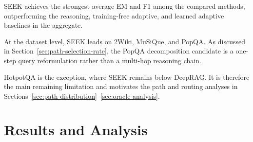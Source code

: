 \documentclass{nthu_thesis}
\begin{document}
\begin{thesiscjk}
\begin{table}[h]
    \centering
    \caption[Main Results]{Main EM/F1 results on the first 1{,}000 development examples from each dataset.}
    \label{tab:main-results}
    \setlength{\tabcolsep}{4pt}
    \scriptsize
\end{table}

SEEK achieves the strongest average EM and F1 among the compared methods, outperforming the reasoning, training-free adaptive, and learned adaptive baselines in the aggregate.

At the dataset level, SEEK leads on 2Wiki, MuSiQue, and PopQA. As discussed in Section~\ref{sec:path-selection-rate}, the PopQA decomposition candidate is a one-step query reformulation rather than a multi-hop reasoning chain.

HotpotQA is the exception, where SEEK remains below DeepRAG. It is therefore the main remaining limitation and motivates the path and routing analyses in Sections~\ref{sec:path-distribution}--\ref{sec:oracle-analysis}.

\chapter{Results and Analysis}
\label{ch:results}


\end{thesiscjk}
\end{document}
